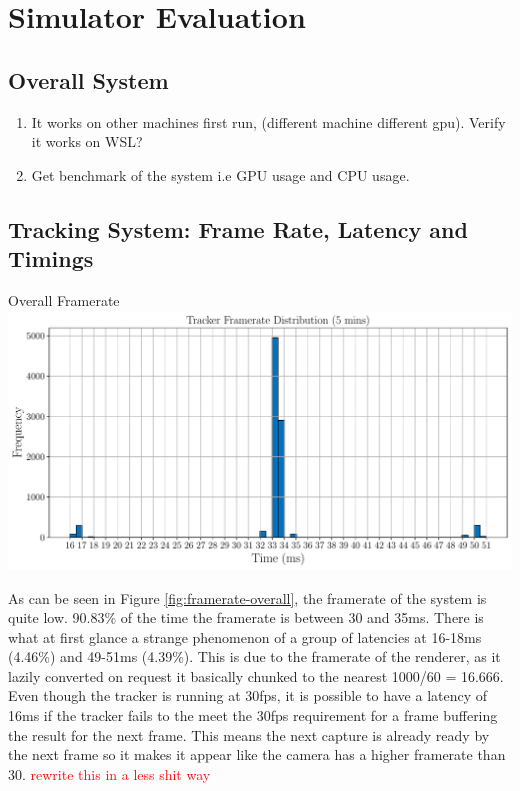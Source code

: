 \section{Simulator Evaluation}

\subsection{Overall System}
\begin{enumerate}
	\item It works on other machines first run, (different machine different gpu). Verify it works on WSL?
	\item Get benchmark of the system i.e GPU usage and CPU usage.
\end{enumerate}

\subsection{Tracking System: Frame Rate, Latency and Timings}

\begin{figureBox}[label={fig:framerate-overall}, width=1.0\linewidth]{Overall Framerate}
	\includegraphics[width = 1.0\linewidth]{./evaluation/figures/framerate-overall.pdf}
\end{figureBox}

As can be seen in Figure \ref{fig:framerate-overall}, the framerate of the system is quite low. 90.83\% of the time the framerate is between 30 and 35ms. There is what at first glance a strange phenomenon of a group of latencies at 16-18ms (4.46\%) and 49-51ms (4.39\%). This is due to the framerate of the renderer, as it lazily converted on request it basically chunked to the nearest 1000/60 = 16.666. Even though the tracker is running at 30fps, it is possible to have a latency of 16ms if the tracker fails to the meet the 30fps requirement for a frame buffering the result for the next frame. This means the next capture is already ready by the next frame so it makes it appear like the camera has a higher framerate than 30. \textcolor{red}{rewrite this in a less shit way}

